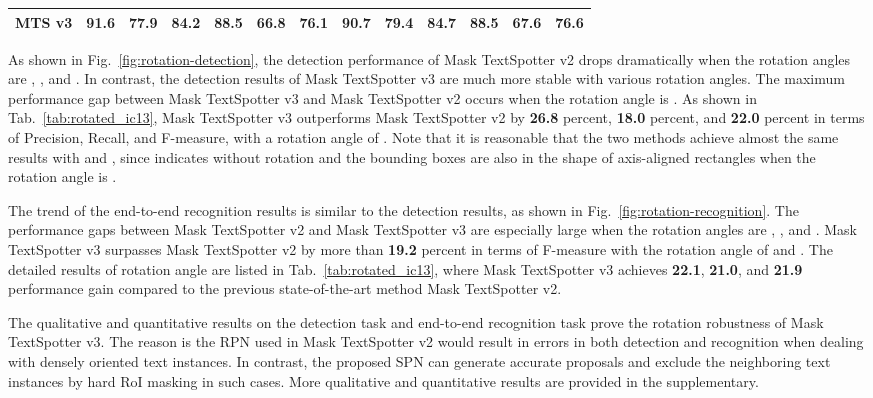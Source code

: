 \documentclass[runningheads]{llncs}
\newcommand{\minisection}[1]{\noindent{\textbf{#1}}}
\begin{document}
\begin{table*}[ht]
\begin{tabularx}{1.0\textwidth}{lc*{5}ccc*{4}c}
    \textbf{MTS v3}     & \textbf{91.6}    & \textbf{77.9}    & \textbf{84.2}    & \textbf{88.5}               & \textbf{66.8}               & \textbf{76.1}             & \textbf{90.7}    & \textbf{79.4}    & \textbf{84.7}    & \textbf{88.5}               & \textbf{67.6}               & \textbf{76.6}             \\ 
    \bottomrule
    \end{tabularx}
    \label{tab:rotated_ic13}
\end{table*}

\minisection{Detection task}
As shown in Fig.~\ref{fig:rotation-detection}, the detection performance of Mask TextSpotter v2 drops dramatically when the rotation angles are , , and . In contrast, the detection results of Mask TextSpotter v3 are much more stable with various rotation angles. The maximum performance gap between Mask TextSpotter v3 and Mask TextSpotter v2 occurs when the rotation angle is . As shown in Tab.~\ref{tab:rotated_ic13}, Mask TextSpotter v3 outperforms Mask TextSpotter v2 by \textbf{26.8} percent, \textbf{18.0} percent, and \textbf{22.0} percent in terms of Precision, Recall, and F-measure, with a rotation angle of . Note that it is reasonable that the two methods achieve almost the same results with  and , since  indicates without rotation and the bounding boxes are also in the shape of axis-aligned rectangles when the rotation angle is .

\minisection{End-to-end recognition task}
The trend of the end-to-end recognition results is similar to the detection results, as shown in Fig.~\ref{fig:rotation-recognition}. The performance gaps between Mask TextSpotter v2 and Mask TextSpotter v3 are especially large when the rotation angles are , , and . Mask TextSpotter v3 surpasses Mask TextSpotter v2 by more than \textbf{19.2} percent in terms of F-measure with the rotation angle of  and . The detailed results of  rotation angle are listed in Tab.~\ref{tab:rotated_ic13}, where Mask TextSpotter v3 achieves \textbf{22.1}, \textbf{21.0}, and \textbf{21.9} performance gain compared to the previous state-of-the-art method Mask TextSpotter v2.

The qualitative and quantitative results on the detection task and end-to-end recognition task prove the rotation robustness of Mask TextSpotter v3. The reason is the RPN used in Mask TextSpotter v2 would result in errors in both detection and recognition when dealing with densely oriented text instances. In contrast, the proposed SPN can generate accurate proposals and exclude the neighboring text instances by hard RoI masking in such cases. More qualitative and quantitative results are provided in the supplementary.
\end{document}
